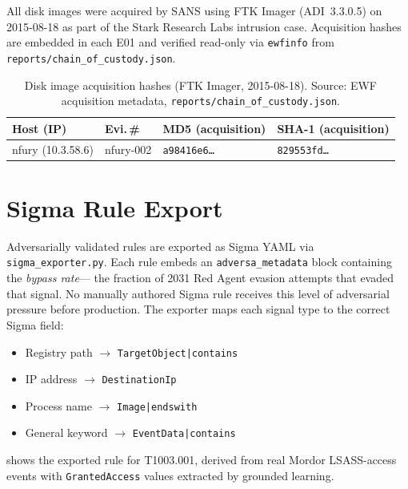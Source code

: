 \documentclass[sigconf, nonacm]{acmart}
\begin{document}
All disk images were acquired by SANS using FTK Imager (ADI~3.3.0.5) on
2015-08-18 as part of the Stark Research Labs intrusion case.
Acquisition hashes are embedded in each E01 and verified read-only via
\texttt{ewfinfo} from \texttt{reports/chain\_of\_custody.json}.

\begin{table}[ht]
\centering
\caption{Disk image acquisition hashes (FTK Imager, 2015-08-18).
  Source: EWF acquisition metadata, \texttt{reports/chain\_of\_custody.json}.}
\label{tab:coc}
\small
\begin{tabular}{@{}llll@{}}
\toprule
Host (IP)         & Evi.\,\# & MD5 (acquisition) & SHA-1 (acquisition) \\
\midrule
nfury (10.3.58.6) & nfury-002 & \texttt{a98416e6\ldots} & \texttt{829553fd\ldots} \\
\bottomrule
\end{tabular}
\end{table}

\FloatBarrier
\section{Sigma Rule Export}
\label{sec:sigma}

Adversarially validated rules are exported as Sigma YAML via
\texttt{sigma\_exporter.py}. Each rule embeds an
\texttt{adversa\_metadata} block containing the \emph{bypass rate}—
the fraction of \num{2031} Red Agent evasion attempts that evaded
that signal. No manually authored Sigma rule receives this level
of adversarial pressure before production. The exporter maps each
signal type to the correct Sigma field:

\begin{itemize}\setlength\itemsep{0pt}
  \item Registry path $\rightarrow$ \texttt{TargetObject|contains}
  \item IP address $\rightarrow$ \texttt{DestinationIp}
  \item Process name $\rightarrow$ \texttt{Image|endswith}
  \item General keyword $\rightarrow$ \texttt{EventData|contains}
\end{itemize}

 shows the exported rule for T1003.001, derived from
real Mordor LSASS-access events with \texttt{GrantedAccess} values
extracted by grounded learning.
\end{document}
